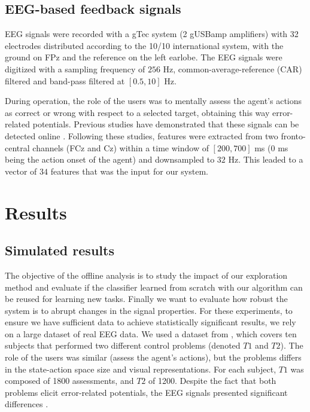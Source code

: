 \subsection{EEG-based feedback signals}

EEG signals were recorded with a gTec system (2 gUSBamp amplifiers) with 32 electrodes distributed according to the 10/10 international system, with the ground on FPz and the reference on the left earlobe. The EEG signals were digitized with a sampling frequency of $256$ Hz, common-average-reference (CAR) filtered and band-pass filtered at $[0.5, 10]$ Hz. 

During operation, the role of the users was to mentally assess the agent's actions as correct or wrong with respect to a selected target, obtaining this way error-related potentials. Previous studies have demonstrated that these signals can be detected online \cite{FerrezErrores}. Following these studies, features were extracted from two fronto-central channels (FCz and Cz) within a time window of $[200,700]$ ms ($0$ ms being the action onset of the agent) and downsampled to $32$ Hz. This leaded to a vector of $34$ features that was the input for our system.

\section{Results}

\subsection{Simulated results}

The objective of the offline analysis is to study the impact of our exploration method and evaluate if the classifier learned from scratch with our algorithm can be reused for learning new tasks. Finally we want to evaluate how robust the system is to abrupt changes in the signal properties. For these experiments, to ensure we have sufficient data to achieve statistically significant results, we rely on a large dataset of real EEG data. We used a dataset from \cite{iturrate2013task}, which covers ten subjects that performed two different control problems (denoted $T1$ and $T2$). The role of the users was similar (assess the agent's actions), but the problems differs in the state-action space size and visual representations. For each subject, $T1$ was composed of 1800 assessments, and $T2$ of 1200. Despite the fact that both problems elicit error-related potentials, the EEG signals presented significant differences \cite{iturrate2013task}.

